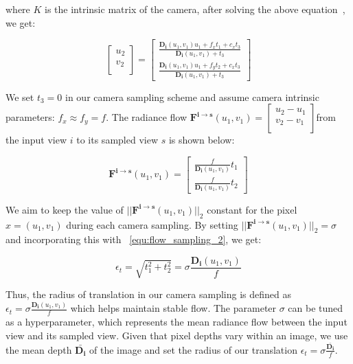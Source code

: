 where $K$ is the intrinsic matrix of the camera, after solving the above equation~\citep{bian2021auto}, we get:


\begin{equation}
\begin{bmatrix}
     u_2\\
     v_2\\
    \end{bmatrix} 
= \begin{bmatrix}
\frac{\bm{D_i}(u_1, v_1)u_1+f_xt_1+c_xt_3}{\bm{D_i}(u_1, v_1) + t_3} \\
\frac{\bm{D_i}(u_1, v_1)u_1+f_yt_2+c_xt_3}{\bm{D_i}(u_1, v_1) + t_3} 
\end{bmatrix} 
\end{equation}


We set $ t_3 = 0 $ in our camera sampling scheme and assume camera intrinsic parameters: $f_x\approx f_y=f$. 
The radiance flow $\bm{F^{i\rightarrow s}}(u_1, v_1) = \begin{bmatrix}
     u_2 - u_1\\
     v_2 - v_1\\
    \end{bmatrix} $from the input view $i$ to its sampled view $s$ is shown below:

\begin{equation}
\bm{F^{i\rightarrow s}}(u_1, v_1) = 
    \begin{bmatrix}
    \frac{f}{\bm{D_i}(u_1, v_1)}t_1 \\
    \frac{f}{\bm{D_i}(u_1, v_1)}t_2
    \end{bmatrix} 
\label{equ:flow_sampling_2}
\end{equation}

We aim to keep the value of
$||\bm{F^{i\rightarrow s}}(u_1, v_1)||_2$  constant for the pixel $x = (u_1, v_1)$
during each camera sampling. By setting $||\bm{F^{i\rightarrow s}}(u_1, v_1)||_2 = \sigma $ and
incorporating this with ~\eqref{equ:flow_sampling_2}, 
we get:

\begin{equation}
    \epsilon_t = \sqrt{t_1^2 + t_2^2}  =  \sigma  \frac{\bm{D_i}(u_1, v_1)}{f}
\end{equation}

Thus, the radius of translation in our camera sampling 
is defined as 
$\epsilon_t = \sigma \frac{\bm{D_i}(u_1, v_1)}{f} $ 
which helps maintain stable flow.
%
The parameter $\sigma$ can be tuned as a hyperparameter,
which represents the mean radiance flow between the input view 
and its sampled view.
%
Given that pixel depths vary within an image, 
we use the mean depth $ \bar{\bm{D_i}} $ of the image 
and set the radius of our translation
$\epsilon_t = \sigma  \frac{\bar{\bm{D_i}}}{f} $.
%

